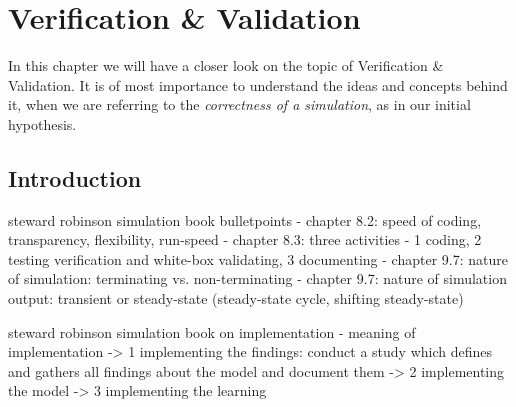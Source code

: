 \chapter{Verification \& Validation}
\label{chap:v_and_v}

In this chapter we will have a closer look on the topic of Verification \& Validation. It is of most importance to understand the ideas and concepts behind it, when we are referring to the \textit{correctness of a simulation}, as in our initial hypothesis.


\section{Introduction}
steward robinson simulation book bulletpoints
- chapter 8.2: speed of coding, transparency, flexibility, run-speed
- chapter 8.3: three activities - 1 coding, 2 testing verification and white-box validating, 3 documenting
- chapter 9.7: nature of simulation: terminating vs. non-terminating
- chapter 9.7: nature of simulation output: transient or steady-state (steady-state cycle, shifting steady-state)

steward robinson simulation book on implementation
- meaning of implementation
	-> 1 implementing the findings: conduct a study which defines and gathers all findings about the model and document them
	-> 2 implementing the model
	-> 3 implementing the learning

